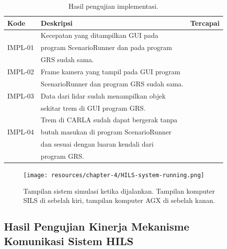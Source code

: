 \begin{table}[!htbp]
	\begin{center}
		\begin{tabular}{|l|l|l|}
			\hline
			\textbf{Kode} & \textbf{Deskripsi}                         & \textbf{Tercapai} \\
			\hline
			              & Kecepatan yang ditampilkan GUI pada        &                   \\
			IMPL-01       & program ScenarioRunner dan pada program    & \checkmark        \\
			              & GRS sudah sama.                            &                   \\
			\hline
			IMPL-02       & Frame kamera yang tampil pada GUI program  & \checkmark        \\
			              & ScenarioRunner dan program GRS sudah sama. &                   \\
			\hline
			IMPL-03       & Data dari lidar sudah menampilkan objek    & \checkmark        \\
			              & sekitar trem di GUI program GRS.           &                   \\
			\hline
			              & Trem di CARLA sudah dapat bergerak tanpa   &                   \\
			IMPL-04       & butuh masukan di program ScenarioRunner    & \checkmark        \\
			              & dan sesuai dengan luaran kendali dari      &                   \\
			              & program GRS.                               &                   \\
			\hline
		\end{tabular}
	\end{center}

	\caption{Hasil pengujian implementasi.}
	\label{chapter-4-tbl-impl-criteria-result}
\end{table}

\begin{figure}[!htbp]
	\centering
	\texttt{[image: resources/chapter-4/HILS-system-running.png]}
	\caption{Tampilan sistem simulasi ketika dijalankan. Tampilan komputer SILS
		di sebelah kiri, tampilan komputer AGX di sebelah kanan.}
	\label{chapter-4-fig-hils-running}
\end{figure}

\subsection{Hasil Pengujian Kinerja Mekanisme Komunikasi Sistem HILS}

